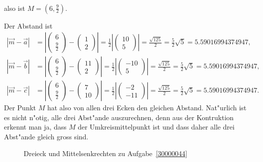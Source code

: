 \begin{loesung}
\begin{teilaufgaben}
\begin{align*}
\end{align*}
also ist $M=(6,\frac92)$.
%
%
\item
Der Abstand ist
\begin{align*}
|\vec{m}-\vec{a}|
&=
\left|\begin{pmatrix}6\\\frac92\end{pmatrix}-\begin{pmatrix}1\\2\end{pmatrix}\right|
=
\frac12\left|\begin{pmatrix}10\\5\end{pmatrix}\right|
=
\frac{\sqrt{125}}2=\frac52\sqrt{5}
= 5.59016994374947,
\\
|\vec{m}-\vec{b}|
&=
\left|\begin{pmatrix}6\\\frac92\end{pmatrix}-\begin{pmatrix}11\\2\end{pmatrix}\right|
=
\frac12\left|\begin{pmatrix}-10\\5\end{pmatrix}\right|
=
\frac{\sqrt{125}}2=\frac52\sqrt{5}
= 5.59016994374947,
\\
|\vec{m}-\vec{c}|
&=
\left|\begin{pmatrix}6\\\frac92\end{pmatrix}-\begin{pmatrix}7\\10\end{pmatrix}\right|
=
\frac12\left|\begin{pmatrix}-2\\-11\end{pmatrix}\right|
=
\frac{\sqrt{125}}2=\frac52\sqrt{5}
= 5.59016994374947.
\end{align*}
Der Punkt $M$ hat also von allen drei Ecken den gleichen Abstand.
Nat"urlich ist es nicht n"otig, alle drei Abst"ande auszurechnen, denn
aus der Kontruktion erkennt man ja, dass $M$ der Umkreismittelpunkt ist
und dass daher alle drei Abst"ande gleich gross sind.
\qedhere
\end{teilaufgaben}
\begin{figure}
\centering
{}
\caption{Dreieck und Mittelsenkrechten zu Aufgabe~\ref{30000044}
\label{30000044:dreieck}}
\end{figure}
\end{loesung}

